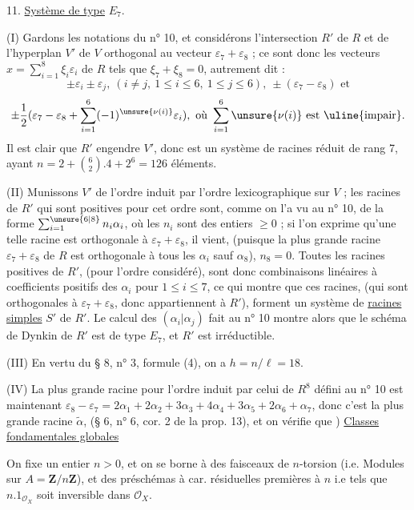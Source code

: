 11. \uline{Système de type} $E_7$.

(I) Gardons les notations du n° 10, et considérons l'intersection $R'$ de $R$ et de l'hyperplan $V'$ de $V$ orthogonal au vecteur $\varepsilon_7+\varepsilon_8$ ; ce sont donc les vecteurs $x=\sum_{i=1}^8\xi_i\varepsilon_i$ de $R$ tels que $\xi_7+\xi_8=0$, autrement dit :
\[
\pm\varepsilon_i\pm\varepsilon_j,\ (i\ne j,\ 1\leq i\leq6,\ 1\leq j\leq6),\ \pm(\varepsilon_7-\varepsilon_8)\text{ et}
\]
\[
\pm\frac12(\varepsilon_7-\varepsilon_8+\sum_{i=1}^6(-1)^{\unsure{\nu(i)}}\varepsilon_i),\ \text{où }\sum_{i=1}^6\unsure{\nu(i)}\text{ est \uline{impair}.}
\]
Il est clair que $R'$ engendre $V'$, donc est un système de racines réduit de rang 7, ayant $n=2+\binom62.4+2^6=126$ éléments.

(II) Munissons $V'$ de l'ordre induit par l'ordre lexicographique sur $V$ ; les racines de $R'$ qui sont positives pour cet ordre sont, comme on l'a vu au n° 10, de la forme $\sum_{i=1}^{\unsure{6|8}}n_i\alpha_i$, où les $n_i$ sont des entiers $\geq0$ ; si l'on exprime qu'une telle racine est orthogonale à $\varepsilon_7+\varepsilon_8$, il vient, (puisque la plus grande racine $\varepsilon_7+\varepsilon_8$ de $R$ est orthogonale à tous les $\alpha_i$ sauf $\alpha_8$), $n_8=0$. Toutes les racines positives de $R'$, (pour l'ordre considéré), sont donc combinaisons linéaires à coefficients positifs des $\alpha_i$ pour $1\leq i\leq7$, ce qui montre que ces racines, (qui sont orthogonales à $\varepsilon_7+\varepsilon_8$, donc appartiennent à $R'$), forment un système de \uline{racines simples} $S'$ de $R'$. Le calcul des $(\alpha_i|\alpha_j)$ fait au n° 10 montre alors que le schéma de Dynkin de $R'$ est de type $E_7$, et $R'$ est irréductible.

(III) En vertu du § 8, n° 3, formule (4), on a $h=n/\ell=18$.

(IV) La plus grande racine pour l'ordre induit par celui de $R^8$ défini au n° 10 est maintenant $\varepsilon_8-\varepsilon_7=2\alpha_1+2\alpha_2+3\alpha_3+4\alpha_4+3\alpha_5+2\alpha_6+\alpha_7$, donc c'est la plus grande racine $\widetilde\alpha$, (§ 6, n° 6, cor. 2 de la prop. 13), et on vérifie que
) \uline{Classes fondamentales globales}

On fixe un entier $n>0$, et on se
borne à des faisceaux de $n$-torsion (i.e. Modules sur $A=\mathbf Z/n\mathbf Z$), et des préschémas à car. résiduelles premières à $n$ i.e tels que $n.1_{\mathcal O_X}$ soit inversible dans $\mathcal O_X$.


